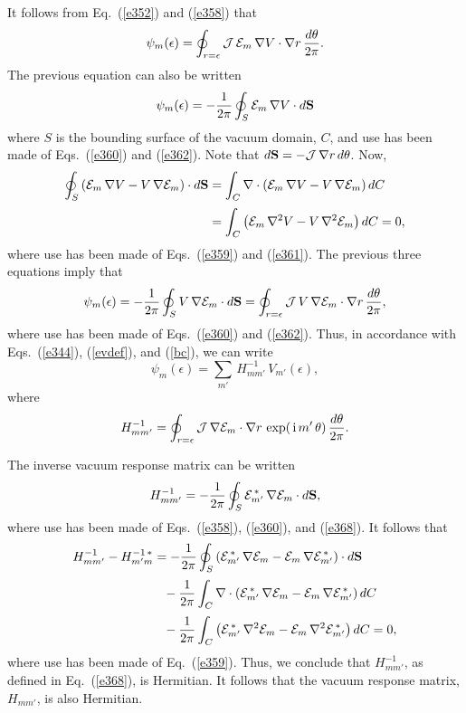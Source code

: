 \documentclass[12pt,prb,aps]{revtex4-1}
\begin{document}
It follows from Eq.~(\ref{e352}) and (\ref{e358}) that
\begin{equation}
\psi_m(\epsilon) = \oint_{r=\epsilon}{\cal J}\,{\cal E}_m\,\nabla V\cdot \nabla r\,\frac{d\theta}{2\pi}.
\end{equation}
The previous equation can also be written
\begin{equation}
\psi_m (\epsilon)=-\frac{1}{2\pi} \oint_{S}{\cal E}_m\,\nabla V\cdot d{\bf S}
\end{equation}
where $S$ is the bounding surface of the vacuum domain, $C$, and use has been made of Eqs.~(\ref{e360}) and (\ref{e362}). 
Note that $d{\bf S} = - {\cal J}\,{\nabla}r\,d\theta$.
Now,
\begin{align}
\oint_S\left({\cal E}_m\,\nabla V-V\,\nabla{\cal E}_m\right)\cdot d{\bf S}&=
\int_C\nabla\cdot\left({\cal E}_m\,\nabla V -V\,\nabla{\cal E}_m\right)dC\nonumber\\[0.5ex]
&
=\int_C\left({\cal E}_m\,\nabla^2 V - V\,\nabla^2{\cal E}_m\right)dC = 0,
\end{align}
where use has been made of Eqs.~(\ref{e359}) and (\ref{e361}). The previous three equations imply that 
\begin{equation}
\psi_m(\epsilon) = -\frac{1}{2\pi} \oint_{S}V\,\nabla {\cal E}_m\cdot d{\bf S}=  \oint_{r=\epsilon}{\cal J}\,V\,\nabla {\cal E}_m\cdot \nabla r\,\frac{d\theta}{2\pi},
\end{equation}
where  use has been made of Eqs.~(\ref{e360}) and (\ref{e362}).
Thus, in accordance with Eqs.~(\ref{e344}), (\ref{evdef}), and (\ref{bc}), we can
write
\begin{equation}
\psi_m(\epsilon) = \sum_{m'}\,H_{mm'}^{-1}\,V_{m'}(\epsilon),
\end{equation}
where 
\begin{equation}\label{e368}
H_{mm'}^{-1}=\oint_{r=\epsilon}{\cal J}\,\nabla {\cal E}_m\cdot \nabla r\,\exp(\,{\rm i}\,m'\,\theta)\,\frac{d\theta}{2\pi}.
\end{equation}

The inverse vacuum response matrix can be written
\begin{equation}\label{e369}
H_{mm'}^{-1} =-\frac{1}{2\pi}\oint_S {\cal E}_{m'}^{\,\ast}\,\nabla{\cal E}_m\cdot d{\bf S},
\end{equation}
where use has been made of Eqs.~(\ref{e358}), (\ref{e360}), and (\ref{e368}). It follows that
\begin{align}\label{e370}
H_{mm'}^{-1}-H_{m'm}^{-1\,\ast} &= -\frac{1}{2\pi}\oint_S\left({\cal E}_{m'}^{\,\ast}\,\nabla{\cal E}_m-{\cal E}_m\,\nabla{\cal E}_{m'}^{\,\ast}\right)\cdot
d{\bf S}\nonumber\\[0.5ex]
&\phantom{=}-\frac{1}{2\pi}\int_C\nabla\cdot\left({\cal E}_{m'}^{\,\ast}\,\nabla{\cal E}_m-{\cal E}_m\,\nabla{\cal E}_{m'}^{\,\ast}\right)dC\nonumber\\[0.5ex]
&\phantom{=}-\frac{1}{2\pi}\int_C\left({\cal E}_{m'}^{\,\ast}\,\nabla^2{\cal E}_m-{\cal E}_m\,\nabla^2{\cal E}_{m'}^{\,\ast}\right)dC=0,
\end{align}
where use has been made of Eq.~(\ref{e359}). Thus, we conclude that $H_{mm'}^{-1}$, as defined in Eq.~(\ref{e368}), is   Hermitian. It follows that the vacuum response matrix, $H_{mm'}$, is also Hermitian. 
\end{document}
